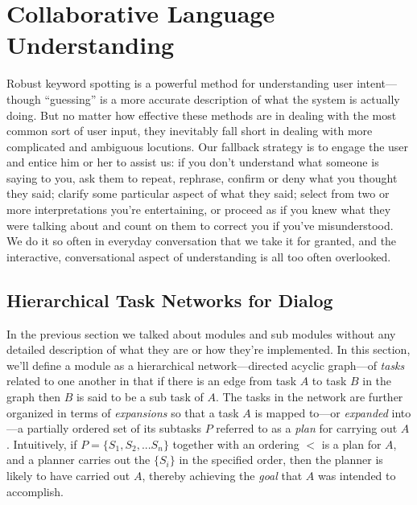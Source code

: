 \documentclass[letterpaper,11pt]{article}
\begin{document}
\section*{Collaborative Language Understanding}

Robust keyword spotting is a powerful method for understanding user intent---though ``guessing'' is a more accurate description of what the system is actually doing. But no matter how effective these methods are in dealing with the most common sort of user input, they inevitably fall short in dealing with more complicated and ambiguous locutions. Our fallback strategy is to engage the user and entice him or her to assist us: if you don't understand what someone is saying to you, ask them to repeat, rephrase, confirm or deny what you thought they said; clarify some particular aspect of what they said; select from two or more interpretations you're entertaining, or proceed as if you knew what they were talking about and count on them to correct you if you've misunderstood. We do it so often in everyday conversation that we take it for granted, and the interactive, conversational aspect of understanding is all too often overlooked.


\subsection*{Hierarchical Task Networks for Dialog}

In the previous section we talked about modules and sub modules without any detailed description of what they are or how they're implemented. In this section, we'll define a module as a hierarchical network---directed acyclic graph---of {\it{tasks}} related to one another in that if there is an edge from task $A$ to task $B$ in the graph then $B$ is said to be a sub task of $A$. The tasks in the network are further organized in terms of {\it{expansions}} so that a task $A$ is mapped to---or {\it{expanded}} into---a partially ordered set of its subtasks $P$ referred to as a {\it{plan}} for carrying out $A$. Intuitively, if $P = \{S_1,S_2,...S_n\}$ together with an ordering $<$ is a plan for $A$, and a planner carries out the $\{S_i\}$ in the specified order, then the planner is likely to have carried out $A$, thereby achieving the {\it{goal}} that $A$ was intended to accomplish.  
\end{document}
